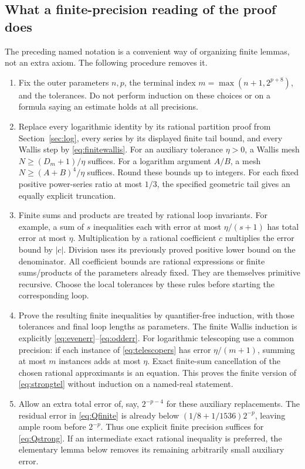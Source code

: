 \documentclass[11pt]{article}
\theoremstyle{definition}
\begin{document}
\subsection{What a finite-precision reading of the proof does}

The preceding named notation is a convenient way of organizing finite
lemmas, not an extra axiom. The following procedure removes it.

\begin{enumerate}
\item Fix the outer parameters $n,p$, the terminal index
$m=\max(n+1,2^{p+8})$, and the tolerances. Do not perform induction
on these choices or on a formula saying an estimate holds at all
precisions.

\item Replace every logarithmic identity by its rational partition proof
from Section~\ref{sec:log}, every series by its displayed finite tail
bound, and every Wallis step by \eqref{eq:finitewallis}. For an auxiliary
tolerance $\eta>0$, a Wallis mesh
$N\ge(D_m+1)/\eta$ suffices. For a logarithm argument $A/B$, a
mesh $N\ge(A+B)^4/\eta$ suffices. Round these bounds up to
integers. For each fixed positive power-series ratio at most $1/3$,
the specified geometric tail gives an equally explicit truncation.

\item Finite sums and products are treated by rational loop invariants.
For example, a sum of $s$ inequalities each with error at most
$\eta/(s+1)$ has total error at most $\eta$. Multiplication by a
rational coefficient $c$ multiplies the error bound by $|c|$.
Division uses its previously proved positive lower bound on the
denominator. All coefficient bounds are rational expressions or finite
sums/products of the parameters already fixed. They are themselves
primitive recursive. Choose the local tolerances by these rules before
starting the corresponding loop.

\item Prove the resulting finite inequalities by quantifier-free
induction, with those tolerances and final loop lengths as parameters.
The finite Wallis induction is explicitly
\eqref{eq:evenerr}--\eqref{eq:odderr}. For logarithmic telescoping use
a common precision: if each instance of \eqref{eq:telescopers} has
error $\eta/(m+1)$, summing at most $m$ instances adds at most
$\eta$. Exact finite-sum cancellation of the chosen rational
approximants is an equation. This proves the finite version of
\eqref{eq:strongtel} without induction on a named-real statement.

\item Allow an extra total error of, say, $2^{-p-4}$ for these
auxiliary replacements. The residual error in \eqref{eq:Qfinite}
is already below $(1/8+1/1536)2^{-p}$, leaving ample room before
$2^{-p}$. Thus one explicit finite precision suffices for
\eqref{eq:Qstrong}. If an intermediate exact rational inequality is
preferred, the elementary lemma below removes its remaining
arbitrarily small auxiliary error.
\end{enumerate}
\end{document}
